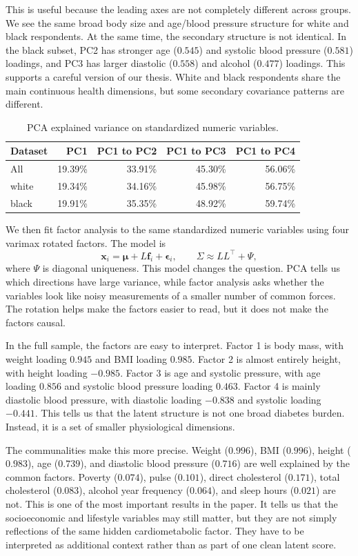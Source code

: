 \documentclass[10pt]{article}
\begin{document}
This is useful because the leading axes are not completely different across groups. We see the same broad body size and age/blood pressure structure for white and black respondents. At the same time, the secondary structure is not identical. In the black subset, PC2 has stronger age ($0.545$) and systolic blood pressure ($0.581$) loadings, and PC3 has larger diastolic ($0.558$) and alcohol ($0.477$) loadings. This supports a careful version of our thesis. White and black respondents share the main continuous health dimensions, but some secondary covariance patterns are different.

\begin{table}[H]
\centering
\caption{PCA explained variance on standardized numeric variables.}
\label{tab:pca}
\small
\begin{tabular}{lrrrr}
\toprule
Dataset & PC1 & PC1 to PC2 & PC1 to PC3 & PC1 to PC4 \\
\midrule
All & 19.39\% & 33.91\% & 45.30\% & 56.06\% \\
white & 19.34\% & 34.16\% & 45.98\% & 56.75\% \\
black & 19.91\% & 35.35\% & 48.92\% & 59.74\% \\
\bottomrule
\end{tabular}
\end{table}

We then fit factor analysis to the same standardized numeric variables using four varimax rotated factors. The model is
\[
  \bm{x}_i=\bm{\mu}+L\bm{f}_i+\bm{\epsilon}_i,\qquad
  \Sigma \approx LL^{\top}+\Psi,
\]
where $\Psi$ is diagonal uniqueness. This model changes the question. PCA tells us which directions have large variance, while factor analysis asks whether the variables look like noisy measurements of a smaller number of common forces. The rotation helps make the factors easier to read, but it does not make the factors causal.

In the full sample, the factors are easy to interpret. Factor 1 is body mass, with weight loading $0.945$ and BMI loading $0.985$. Factor 2 is almost entirely height, with height loading $-0.985$. Factor 3 is age and systolic pressure, with age loading $0.856$ and systolic blood pressure loading $0.463$. Factor 4 is mainly diastolic blood pressure, with diastolic loading $-0.838$ and systolic loading $-0.441$. This tells us that the latent structure is not one broad diabetes burden. Instead, it is a set of smaller physiological dimensions.

The communalities make this more precise. Weight ($0.996$), BMI ($0.996$), height ($0.983$), age ($0.739$), and diastolic blood pressure ($0.716$) are well explained by the common factors. Poverty ($0.074$), pulse ($0.101$), direct cholesterol ($0.171$), total cholesterol ($0.083$), alcohol year frequency ($0.064$), and sleep hours ($0.021$) are not. This is one of the most important results in the paper. It tells us that the socioeconomic and lifestyle variables may still matter, but they are not simply reflections of the same hidden cardiometabolic factor. They have to be interpreted as additional context rather than as part of one clean latent score.
\end{document}
